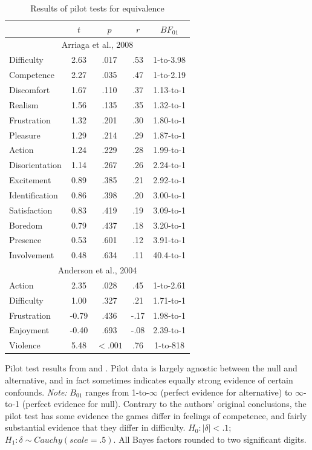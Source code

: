 \documentclass[man]{apa6}
\begin{document}
\begin{singlespace}
\begin{table}
\caption{Results of pilot tests for equivalence}
\begin{center}
\begin{tabular}{lcccc} 
&$t$&$p$&$r$&$BF_{01}$ \\ \hline
\multicolumn{5}{c}{Arriaga et al., 2008} \\
Difficulty&2.63&.017&.53&1-to-3.98 \\
Competence&2.27&.035&.47&1-to-2.19 \\
Discomfort&1.67&.110&.37&1.13-to-1 \\ 
Realism&1.56&.135&.35&1.32-to-1 \\
Frustration&1.32&.201&.30&1.80-to-1 \\
Pleasure&1.29&.214&.29&1.87-to-1 \\
Action&1.24&.229&.28&1.99-to-1 \\
Disorientation&1.14&.267&.26&2.24-to-1 \\ 
Excitement&0.89&.385&.21&2.92-to-1 \\
Identification&0.86&.398&.20&3.00-to-1 \\
Satisfaction&0.83&.419&.19&3.09-to-1 \\ 
Boredom&0.79&.437&.18&3.20-to-1 \\ 
Presence&0.53&.601&.12&3.91-to-1 \\
Involvement&0.48&.634&.11&40.4-to-1 \\
\multicolumn{5}{c}{Anderson et al., 2004}\\
Action&2.35&.028&.45&1-to-2.61 \\
Difficulty&1.00&.327&.21&1.71-to-1 \\
Frustration&-0.79&.436&-.17&1.98-to-1 \\
Enjoyment&-0.40&.693&-.08&2.39-to-1 \\
Violence&5.48&$<.001$&.76&1-to-818 \\ \hline
\end{tabular}
\end{center}

\vspace{4mm}
Pilot test results from \citet{Arriaga:etal:2008} and \citet{Anderson:etal:2004}. Pilot data is largely agnostic between the null and alternative, and in fact sometimes indicates equally strong evidence of certain confounds. {\em Note:} $B_{01}$ ranges from 1-to-$\infty$ (perfect evidence for alternative) to $\infty$-to-1 (perfect evidence for null). Contrary to the authors’ original conclusions, the pilot test has some evidence the games differ in feelings of competence, and fairly substantial evidence that they differ in difficulty. $H_0: |\delta| < .1$; $H_1: \delta \sim Cauchy(scale = .5)$. All Bayes factors rounded to two significant digits.
\label{ArriagaAndersonPilot}
\end{table}
\end{singlespace}
\end{document}
